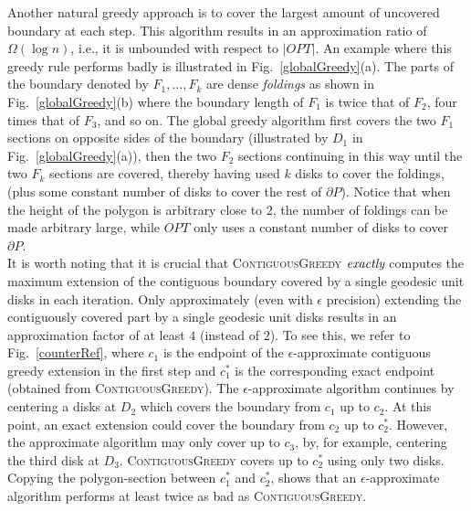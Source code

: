 \documentclass{llncs}
\begin{document}
Another natural greedy approach is to cover the largest amount of uncovered boundary at each step.  This algorithm results in an approximation ratio of $\Omega(\log n)$, i.e., it is unbounded with respect to $|OPT|$. An example where this greedy rule performs badly is illustrated in Fig.~\ref{globalGreedy}(a). The parts of the boundary denoted by $F_1, \ldots, F_k$ are dense {\em foldings} as shown in Fig.~\ref{globalGreedy}(b) where the boundary length of $F_1$ is twice that of $F_2$, four times that of $F_3$, and so on.  The global greedy algorithm first covers the two $F_1$ sections on opposite sides of the boundary (illustrated by $D_1$ in Fig.~\ref{globalGreedy}(a)), then the two $F_2$ sections continuing in this way until the two $F_k$ sections are covered, thereby having used $k$ disks to cover the foldings, (plus some constant number of disks to cover the rest of $\partial P$). Notice that when the height of the polygon is arbitrary close to $2$, the number of foldings can be made arbitrary large, while $OPT$ only uses a constant number of disks to cover $\partial P$.\\


It is worth noting that it is crucial that  \textsc{ContiguousGreedy} $\emph{exactly}$ computes the maximum extension of the contiguous boundary covered by a single geodesic unit disks in each iteration. Only approximately (even with $\epsilon$ precision) extending the contiguously covered part by a single geodesic unit disks results in an approximation factor of at least $4$ (instead of $2$). To see this, we refer to  Fig.~\ref{counterRef}, where $c_1$ is the endpoint of the $\epsilon$-approximate contiguous greedy extension in the first step and $c^*_1$ is the corresponding exact endpoint (obtained from \textsc{ContiguousGreedy}). The $\epsilon$-approximate algorithm continues by centering a disks at $D_2$ which covers the boundary from $c_1$  up to $c_2$. At this point, an exact extension could cover the boundary from $c_2$ up to $c^*_2$. However, the approximate algorithm may only cover up to $c_3$, by, for example, centering the third disk at $D_3$.  \textsc{ContiguousGreedy} covers up to $c^*_2$ using only two disks. Copying the polygon-section between $c^*_1$ and $c^*_2$, shows that an $\epsilon$-approximate algorithm performs at least twice as bad as \textsc{ContiguousGreedy}.
\end{document}
